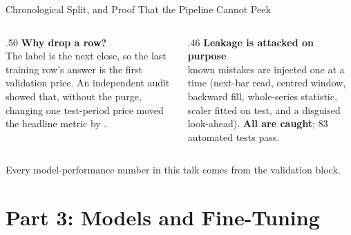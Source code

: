 \documentclass[aspectratio=169,11pt]{beamer}
\newcommand{\currentspeaker}{}
\newcommand{\speaker}[1]{\gdef\currentspeaker{#1}}
\newcounter{progresssection}
\newcommand{\progresssection}[1]{\setcounter{progresssection}{#1}}
\newcommand{\repourl}{https://github.com/Steven-ZYC/INT4096-ML-Financial-Forecasting}
\newcommand{\currentrepolink}{}
\newcommand{\repolink}[2]{\gdef\currentrepolink{%
  \href{\repourl/#1/main/#2}{\color{accent}GitHub: \texttt{\detokenize{#2}}}}}
\newcommand{\act}[1]{\section{#1}}
\begin{document}
\begin{frame}{Chronological Split, and Proof That the Pipeline Cannot Peek}
  \repolink{blob}{tests/test_temporal_integrity.py}
  \speaker{Zhang Yancheng}
  \centering
  \par\vspace{2mm}
  \begin{columns}[T,onlytextwidth]
    \begin{column}{.50\textwidth}
      \small\textbf{Why drop a row?}\\
      \footnotesize The label is the next close, so the last training row's answer is the first
      validation price. An independent audit showed that, without the purge, changing one
      test-period price moved the headline metric by \textbf{\LeakDelta{}}.
    \end{column}
    \begin{column}{.46\textwidth}
      \small\textbf{Leakage is attacked on purpose}\\
      \footnotesize \NMutations{} known mistakes are injected one at a time (next-bar read,
      centred window, backward fill, whole-series statistic, scaler fitted on test, and a disguised
      look-ahead). \textbf{All \NMutations{} are caught}; 83 automated tests pass.
    \end{column}
  \end{columns}
  \par\vspace{2mm}
  \raggedright\footnotesize Every model-performance number in this talk comes from the validation block.
\end{frame}

\act{Part 3: Models and Fine-Tuning}
\progresssection{3}
\end{document}
